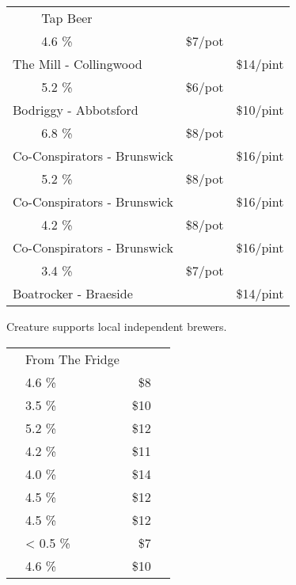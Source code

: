 \documentclass[12pt]{article}
\makeatletter
\newcommand*\ColText[1]{\textcolor{SpringGreen4}{#1}}
\newcommand*\GroupGlassTitle[2]{%
  \noalign{\vspace{2em}}
  \fontfamily{qzc}\selectfont #2 & \vspace{1em}\fontsize{20}{29}\selectfont\ColText{#1}}
\newenvironment{Group}
  {\vspace{2em}\noindent\begin{tabular*}{\textwidth}{@{} p{10mm} l@{\extracolsep{\fill}} r@{\hspace{1em}} r@{}}} %
  {\end{tabular*}}
\newcommand*\Booze[3]{%
  \noalign{\vspace{1em}}
  \multicolumn{2}{l}{ #1 \tiny\dotfill } & \scriptsize #2 \% \tiny\dotfill & \normalsize \$#3}
\newcommand*\Beer[5]{%
  \noalign{\vspace{2em}}
  \Booze{#1}{#3}{#4\tiny/pot} \\
  \multicolumn{2}{l}{ \hspace*{0.1em} \scriptsize #2 } & {} & \normalsize \$#5\tiny/pint}
\newcommand*\Glass[2]{%
    \begin{tikzpicture}[remember picture,overlay]
        \node[xshift=5mm,yshift=0mm]{%
            \texttt{[image: Glasses/\#1.png]}
        };
    \end{tikzpicture}%
}
\newcommand*\GlassWeizen{%
    \Glass{weizen}{4mm}}
\newcommand*\GlassFridge{%
    \Glass{fridge}{7.5mm}}
\makeatother
\begin{document}
%


\begin{Group}
    \GroupGlassTitle{Tap Beer}{\GlassWeizen} \\
    \Beer{Daydream \textbf{Session Ale}}{The Mill - Collingwood}{4.6}{7}{14} \\
    \Beer{Blinker \textbf{Dark Ale}}{Bodriggy - Abbotsford}{5.2}{6}{10} \\
    \Beer{The Renegade \textbf{WC IPA}}{Co-Conspirators - Brunswick}{6.8}{8}{16} \\
    \Beer{The Beekeeper \textbf{Choc Honeycomb Porter}}{Co-Conspirators - Brunswick}{5.2}{8}{16} \\
    \Beer{The Wheelman \textbf{Raspberry Gose}}{Co-Conspirators - Brunswick}{4.2}{8}{16} \\
    \Beer{Miss Pinky \textbf{Raspberry Berliner Weisse}}{Boatrocker - Braeside}{3.4}{7}{14} \\
\end{Group}
\vfill
\begin{center}
	Creature supports local independent brewers.
\end{center}
\pagebreak
\begin{Group}
    \GroupGlassTitle{From The Fridge}{\GlassFridge} \\
    \Booze{Melbourne Bitter}{4.6}{8} \\
    \Booze{Bodriggy Speccy Juice \textbf{Hazy Session IPA}}{3.5}{10} \\
    \Booze{Stomping Ground \textbf{Pale Ale}}{5.2}{12} \\
    \Booze{Stomping Ground \textbf{Passionfruit Smash Sour}}{4.2}{11} \\
    \Booze{Lick Pier \textbf{Alcoholic Ginger Beer}}{4.0}{14} \\
    \Booze{Sopra Sicilian \textbf{Blood Orange Seltzer}}{4.5}{12} \\
    \Booze{Sopra Sicilian \textbf{Limoncello Seltzer}}{4.5}{12} \\
    \Booze{Hop Nation Mind Ya Head \textbf{Non Alcoholic XPA}}{< 0.5}{7} \\
    \Booze{Young Henry's \textbf{Cloudy Cider}}{4.6}{10} \\
\end{Group}
\end{document}
